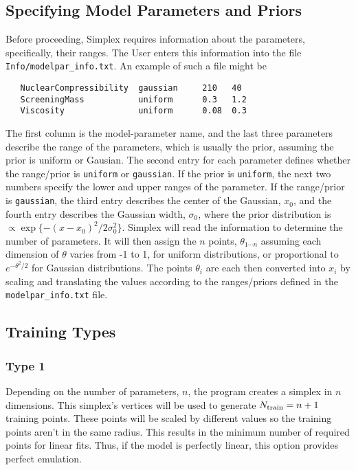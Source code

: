 \documentclass[UserManual.tex]{subfiles}
\begin{document}
\subsection{Specifying Model Parameters and Priors}\label{subsec:modelparinfo}
Before proceeding, Simplex requires information about the parameters, specifically, their ranges. The User enters this information into the file {\tt Info/modelpar\_info.txt}. An example of such a file might be
{\tt\begin{verbatim}
   NuclearCompressibility  gaussian     210   40
   ScreeningMass           uniform      0.3   1.2
   Viscosity               uniform      0.08  0.3
\end{verbatim}
}
The first column is the model-parameter name, and the last three parameters describe the range of the parameters, which is usually the prior, assuming the prior is uniform or Gausian. The second entry for each parameter defines whether the range/prior is {\tt uniform} or {\tt gaussian}. If the prior is {\tt uniform}, the next two numbers specify the lower and upper ranges of the parameter. If the range/prior is {\tt gaussian}, the third entry describes the center of the Gaussian, $x_0$, and the fourth entry describes the Gaussian width, $\sigma_0$, where the prior distribution is $\propto \exp\{-(x-x_0)^2/2\sigma_0^2\}$. Simplex will read the information to determine the number of parameters. It will then assign the $n$ points, $\theta_{1\cdots n}$ assuming each dimension of $\theta$ varies from -1 to 1, for uniform distributions, or proportional to $e^{-\theta^2/2}$ for Gaussian distributions. The points $\theta_i$ are each then converted into $x_i$ by scaling and translating the values according to the ranges/priors defined in the {\tt modelpar\_info.txt} file.

\subsection{Training Types}

\subsubsection{Type 1}
 Depending on the number of parameters, $n$, the program creates a simplex in $n$ dimensions. This simplex's vertices will be used to generate $N_{\rm train}=n+1$ training points. These points will be scaled by different values so the training points aren't in the same radius. This results in the minimum number of required points for linear fits. Thus, if the model is perfectly linear, this option provides perfect emulation. 
\end{document}
